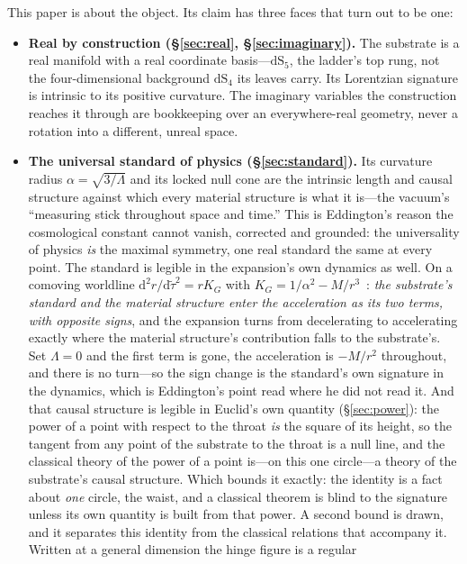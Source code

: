 \documentclass[11pt,a4paper]{article}
\theoremstyle{definition}
\begin{document}
This paper is about the object. Its claim has three faces that turn out to
be one:

\begin{itemize}
\item \textbf{Real by construction (\S\ref{sec:real},
\S\ref{sec:imaginary}).} The substrate is a real manifold with a real
coordinate basis---$\mathrm{dS}_5$, the ladder's top rung, not the
four-dimensional background $\mathrm{dS}_4$ its leaves carry. Its
Lorentzian signature is intrinsic to its positive curvature. The imaginary variables the construction reaches it
through are bookkeeping over an everywhere-real geometry, never a rotation
into a different, unreal space.
\item \textbf{The universal standard of physics (\S\ref{sec:standard}).} Its
curvature radius $\alpha=\sqrt{3/\Lambda}$ and its locked null cone are the
intrinsic length and causal structure against which every material
structure is what it is---the vacuum's ``measuring stick throughout space
and time.'' This is Eddington's reason the cosmological constant cannot
vanish, corrected and grounded: the universality of physics \emph{is} the
maximal symmetry, one real standard the same at every point. The standard is
legible in the expansion's own dynamics as well. On a comoving worldline
$\mathrm{d}^{2}r/\mathrm{d}\tilde\tau^{2}=rK_{G}$ with
$K_{G}=1/\alpha^{2}-M/r^{3}$~\cite{JanzenSlicing}: \emph{the substrate's standard and
the material structure enter the acceleration as its two terms, with
opposite signs}, and the expansion turns from decelerating to accelerating
exactly where the material structure's contribution falls to the
substrate's. Set $\Lambda=0$ and the first term is gone, the acceleration is
$-M/r^{2}$ throughout, and there is no turn---so the sign change is the
standard's own signature in the dynamics, which is Eddington's point read
where he did not read it. And that causal
structure is legible in Euclid's own quantity (\S\ref{sec:power}): the power
of a point with respect to the throat \emph{is} the square of its height, so
the tangent from any point of the substrate to the throat is a null line, and
the classical theory of the power of a point is---on this one circle---a theory
of the substrate's causal structure. Which bounds it exactly: the identity is a
fact about \emph{one} circle, the waist, and a classical theorem is blind to
the signature unless its own quantity is built from that power. A second bound is drawn, and it separates this identity from the classical relations that
accompany it. Written at a general dimension the hinge figure is a regular

\end{itemize}
\end{document}
